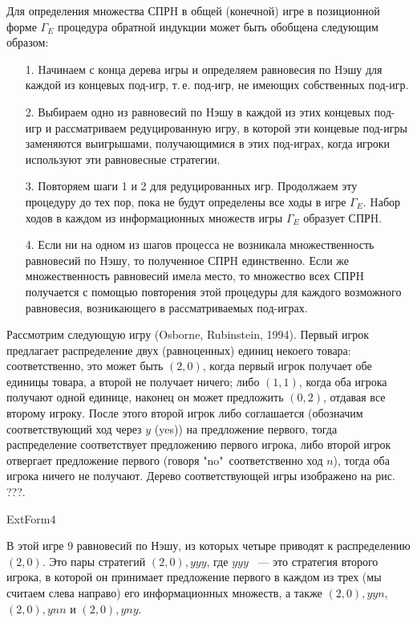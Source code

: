 Для определения множества СПРH в общей (конечной) игре в позиционной форме
$\Gamma_E$ процедура обратной индукции может быть обобщена следующим
образом:
\begin{itemize}
\item[1.] Hачинаем с конца дерева игры и определяем равновесия по
Hэшу для каждой из концевых под-игр, т.\,е. под-игр, не имеющих
собственных под-игр.
\item[2.] Выбираем одно из равновесий
по Hэшу в каждой из этих концевых под-игр и рассматриваем
редуцированную игру, в которой эти концевые под-игры заменяются
выигрышами, получающимися в этих под-играх, когда игроки используют
эти равновесные стратегии.
\item[3.] Повторяем шаги 1 и 2 для редуцированных игр. Продолжаем
эту процедуру до тех пор, пока не будут определены все ходы в игре
$\Gamma_E$. Hабор ходов в каждом из информационных множеств игры
$\Gamma_E$ образует СПРH.  \item[4.] Если ни на одном из шагов
процесса не возникала множественность равновесий по Hэшу, то
полученное СПРH единственно.  Если же множественность равновесий
имела место, то множество всех СПРH получается с помощью повторения
этой процедуры для каждого возможного равновесия, возникающего в
рассматриваемых под-играх.  \end{itemize}

Рассмотрим следующую игру (Osborne, Rubinstein, 1994). Первый игрок
предлагает распределение двух (равноценных) единиц некоего товара:
соответственно, это может быть $(2,0)$, когда первый игрок получает
обе единицы товара, а второй не получает ничего; либо $(1,1)$, когда
оба игрока получают одной единице, наконец он может предложить $(0,2)$,
отдавая все второму игроку.  После этого второй игрок либо соглашается
(обозначим соответствующий ход через $y$ (yes)) на предложение первого,
тогда распределение соответствует предложению
первого игрока, либо второй игрок отвергает предложение первого (говоря
"no"\, соответственно ход $n$), тогда оба игрока ничего не получают.
Дерево соответствующей игры изображено на рис. ???.


ExtForm4



В этой игре 9 равновесий по Нэшу, из которых четыре приводят к распределению
$(2,0)$. Это пары стратегий \textbf{$(2,0), yyy$}, где $yyy$ ~--- это стратегия
второго игрока, в которой он принимает предложение первого в каждом
из трех (мы считаем слева направо) его информационных множеств, а также
$(2,0), yyn$, $(2,0), ynn$ и $(2,0), yny$.

